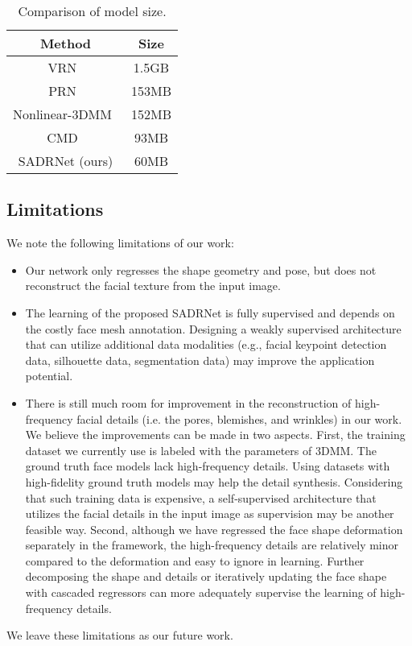 \documentclass[journal]{IEEEtran}
\begin{document}
	\begin{table}
		\begin{center}
			\caption{Comparison of model size.}
			\begin{tabular}{|c|c|}
				\hline
				Method &Size\\
				\hline
				VRN~\cite{VRN} &1.5GB\\
				PRN~\cite{PRN} &153MB\\
				Nonlinear-3DMM~\cite{Nonlinear_3DMM}&152MB\\
				CMD~\cite{FPS}&93MB\\
				SADRNet (ours)&60MB\\
				
				\hline
			\end{tabular}
			
			
		\end{center}
		
		\label{tab:size}
	\end{table}
	
	\subsection{Limitations}
	We note the following limitations of our work:
	\begin{itemize}
		\item Our network only regresses the shape geometry and pose, but does not reconstruct the facial texture from the input image.
		\item The learning of the proposed SADRNet is fully supervised and depends on the costly face mesh annotation.
		Designing a weakly supervised architecture that can utilize additional data modalities (e.g., facial keypoint detection data, silhouette data, segmentation data) may improve the application potential.
		\item There is still much room for improvement in the reconstruction of high-frequency facial details (i.e.
		the pores, blemishes, and wrinkles) in our work. We believe the improvements can be made in two aspects. First, the training dataset we currently use is labeled with the parameters of 3DMM. The ground truth face models lack high-frequency details. Using datasets with high-fidelity ground truth models may help the detail synthesis. Considering that such training data is expensive, a self-supervised architecture that utilizes the facial details in the input image as supervision may be another feasible way. Second, although we have regressed the face shape deformation separately in the framework, the high-frequency details are relatively minor compared to the deformation and easy to ignore in learning. Further decomposing the shape and details or iteratively updating the face shape with cascaded regressors can more adequately supervise the learning of high-frequency details.
	\end{itemize}
	We leave these limitations as our future work.
	
\end{document}
